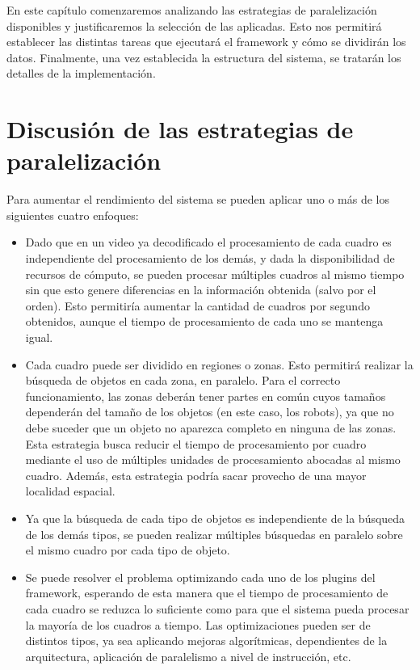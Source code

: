 
En este capítulo comenzaremos analizando las estrategias de paralelización
disponibles y justificaremos la selección de las aplicadas. Esto nos permitirá
establecer las distintas tareas que ejecutará el framework y cómo se dividirán
los datos. Finalmente, una vez establecida la estructura del sistema, se
tratarán los detalles de la implementación.

\section{Discusión de las estrategias de paralelización}

\label{descripcionSistema}

Para aumentar el rendimiento del sistema se pueden aplicar uno o más de los
siguientes cuatro enfoques:

\begin{itemize}

	\item	Dado que en un video ya decodificado el procesamiento de cada
		cuadro es independiente del procesamiento de los demás, y dada
		la disponibilidad de recursos de cómputo, se pueden procesar
		múltiples cuadros al mismo tiempo sin que esto genere
		diferencias en la información obtenida (salvo por el orden).
		Esto permitiría aumentar la cantidad de cuadros por segundo
		obtenidos, aunque el tiempo de procesamiento de cada uno se
		mantenga igual.

	\item	Cada cuadro puede ser dividido en regiones o zonas. Esto
		permitirá realizar la búsqueda de objetos en cada zona, en
		paralelo.
		Para el correcto funcionamiento, las zonas deberán
		tener partes en común cuyos tamaños dependerán del tamaño de los
		objetos (en este caso, los robots), ya que no debe suceder que
		un objeto no aparezca completo en ninguna de las zonas. Esta
		estrategia busca reducir el tiempo de procesamiento por cuadro
		mediante el uso de múltiples unidades de procesamiento abocadas
		al mismo cuadro. Además, esta estrategia podría sacar provecho
		de una mayor localidad espacial.

	\item	Ya que la búsqueda de cada tipo de objetos es independiente de
		la búsqueda de los demás tipos, se pueden realizar múltiples
		búsquedas en paralelo sobre el mismo cuadro por cada tipo de
		objeto.

	\item	Se puede resolver el problema optimizando cada uno de los
		plugins del framework, esperando de esta manera que el tiempo de
		procesamiento de cada cuadro se reduzca lo suficiente como para
		que el sistema pueda procesar la mayoría de los cuadros a
		tiempo. Las optimizaciones pueden ser de distintos tipos, ya sea
		aplicando mejoras algorítmicas, dependientes de la arquitectura,
		aplicación de paralelismo a nivel de instrucción, etc.

\end{itemize}

